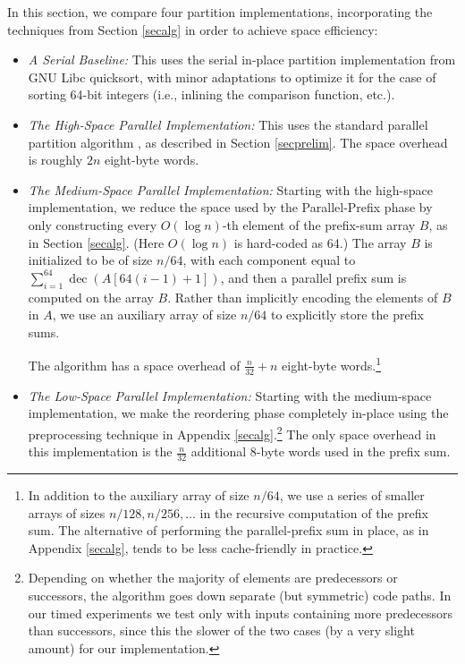 \documentclass[twoside,leqno,twocolumn]{article}
\newcommand{\dec}{\operatorname{dec}}
\begin{document}
In this section, we compare four partition implementations,
incorporating the techniques from Section \ref{secalg} in order to
achieve space efficiency:
\begin{itemize}[leftmargin = .15in]
\item \emph{A Serial Baseline:} This uses the serial in-place
  partition implementation from GNU Libc quicksort, with minor
  adaptations to optimize it for the case of sorting 64-bit integers
  (i.e., inlining the comparison function, etc.).
\item \emph{The High-Space Parallel Implementation:} This uses the
  standard parallel partition algorithm \cite{Blelloch96,AcarBl16}, as
  described in Section \ref{secprelim}. The space overhead is roughly
  $2n$ eight-byte words.
\item \emph{The Medium-Space Parallel Implementation:} Starting with
  the high-space implementation, we reduce the space used by the
  Parallel-Prefix phase by only constructing every $O(\log n)$-th
  element of the prefix-sum array $B$, as in Section
  \ref{secalg}. (Here $O(\log n)$ is hard-coded as 64.) The array $B$
  is initialized to be of size $n / 64$, with each component equal to
  $\sum_{i=1}^{64} \dec(A[64 (i-1)+1])$, and then a parallel prefix sum is computed on
  the array $B$. Rather than implicitly encoding the elements of $B$ in
  $A$, we use an auxiliary array of size $n / 64$ to explicitly store
  the prefix sums.

  The algorithm
  has a space overhead of $\frac{n}{32} + n$ eight-byte
  words.\footnote{In addition to the auxiliary array of size $n / 64$,
    we use a series of smaller arrays of sizes $n / 128, n / 256,
    \ldots$ in the recursive computation of the prefix sum. The
    alternative of performing the parallel-prefix sum in place, as in
    Appendix \ref{secalg}, tends to be less cache-friendly in
    practice.}
\item \emph{The Low-Space Parallel Implementation:}
Starting with the medium-space implementation, we make the reordering
phase completely in-place using the preprocessing technique in Appendix
\ref{secalg}.\footnote{Depending on whether the majority of elements
  are predecessors or successors, the algorithm goes down separate
  (but symmetric) code paths. In our timed experiments we test only
  with inputs containing more predecessors than successors, since this
  the slower of the two cases (by a very slight amount) for our
  implementation.} The only space overhead in this implementation is
the $\frac{n}{32}$ additional 8-byte words used in the prefix sum.
\end{itemize}
\end{document}
